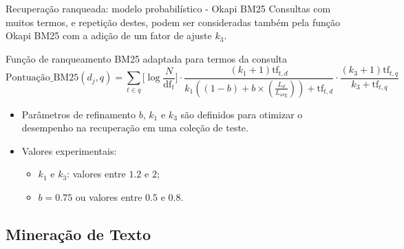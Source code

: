 \documentclass[%
  10pt,%
  aspectratio = 169,%
  compress,%
  t,%
]{beamer}%
\begin{document}
    \begin{frame}[fragile = singleslide]{}{Recuperação ranqueada: modelo probabilístico - Okapi BM25}
        Consultas com muitos termos, e repetição destes, podem ser consideradas também pela função Okapi BM25 com a adição de um fator de ajuste $k_3$.
        
        \begin{block}{Função de ranqueamento BM25 adaptada para termos da consulta}
            \begin{equation}
                \label{eq:okapi-bm25-tf-consulta}
        		\text{Pontuação\_BM25}(d_j, q) = 
        		\sum_{t \in q} 
        		\Bigg[ \log{\frac{N}{\text{df}_{t}}} \Bigg]
        		\cdot 
        		\frac{(k_1 + 1) \text{tf}_{t,d}}{k_1((1-b)+b \times (\frac{L_d}{L_{\text{avg}}})) + \text{tf}_{t,d}} \cdot 
        		\frac{(k_3+1) \text{tf}_{t,q}}{k_3 + \text{tf}_{t,q}}
            \end{equation}
        \end{block}
        \begin{itemize}
            \item Parâmetros de refinamento $b$, $k_1$ e $k_3$ são definidos para otimizar o desempenho na recuperação em uma coleção de teste.
            \item Valores experimentais:
                \begin{itemize}
                    \item $k_1$ e $k_3$: valores entre $1.2$ e $2$;
                    \item $b = 0.75$ ou valores entre $0.5$ e $0.8$.
                \end{itemize}
        \end{itemize}
    \end{frame}
    
    \subsection{Mineração de Texto}\label{subsec:MT}
    
\end{document}
